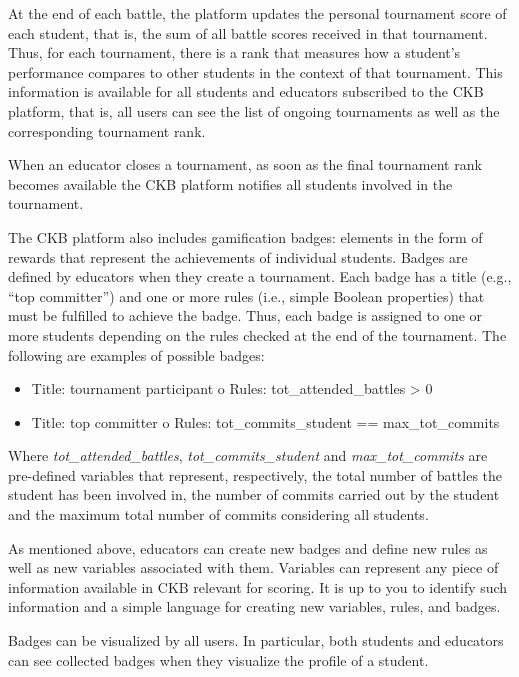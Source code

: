 At the end of each battle, the platform updates the personal tournament score of each student, that is, the sum of all battle scores received in that tournament. Thus, for each tournament, there is a rank that measures how a student's performance compares to other students in the context of that tournament. This information is available for all students and educators subscribed to the CKB platform, that is, all users can see the list of ongoing tournaments as well as the corresponding tournament rank. 


When an educator closes a tournament, as soon as the final tournament rank becomes available the CKB platform notifies all students involved in the tournament.


The CKB platform also includes gamification badges: elements in the form of rewards that represent the achievements of individual students. Badges are defined by educators when they create a tournament. Each badge has a title (e.g., “top committer”) and one or more rules (i.e., simple Boolean properties) that must be fulfilled to achieve the badge. Thus, each badge is assigned to one or more students depending on the rules checked at the end of the tournament. The following are examples of possible badges: 
\begin{itemize}
    \item Title: tournament participant 
o Rules: { tot\_attended\_battles > 0 } 
    \item Title: top committer 
o Rules: { tot\_commits\_student == max\_tot\_commits } 
\end{itemize}


Where \textit{tot\_attended\_battles}, \textit{tot\_commits\_student} and \textit{max\_tot\_commits} are pre-defined variables that represent, respectively, the total number of battles the student has been involved in, the number of commits carried out by the student and the maximum total number of commits considering all students. 


As mentioned above, educators can create new badges and define new rules as well as new variables associated with them. Variables can represent any piece of information available in CKB relevant for scoring. It is up to you to identify such information and a simple language for creating new variables, rules, and badges. 


Badges can be visualized by all users. In particular, both students and educators can see collected badges when they visualize the profile of a student. 
